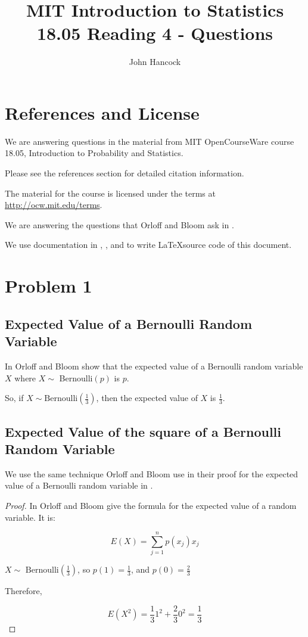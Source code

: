 \documentclass[a4paper,11pt]{article}
\author{John Hancock}
\title{MIT Introduction to Statistics 18.05 Reading 4 - Questions }
\begin{document}
\maketitle
\tableofcontents
\section{References and License}
We are answering questions in the material from MIT OpenCourseWare
course 18.05, Introduction to Probability and Statistics.

Please see the references section for detailed citation information.

The material for the course is licensed under the terms at 
\url{http://ocw.mit.edu/terms}.

We are answering the questions that Orloff and Bloom ask in
\cite{reading4bQ}.

We use documentation in  \cite{latexTilde}, \cite{latexBreakEquation}, 
and \cite{latexProof} to write \LaTeX source code of this document.
 
\label{prob1}
\section{Problem 1}
\subsection{Expected Value of a Bernoulli Random Variable}

In \cite{reading4b} Orloff and Bloom show that the expected value
of a  Bernoulli random variable $X$ where 
$X \sim$  Bernoulli$ \left( p \right)$ is $p$.

So, if $X \sim \text{Bernoulli} \left( \frac{1}{3} \right)$, then
the expected value of $X$ is $\frac{1}{3}$.

\subsection{Expected Value of the square of a Bernoulli Random Variable}

We use the same technique Orloff and Bloom use in their proof for the
expected value of a Bernoulli random variable in \cite{reading4b}.

\begin{proof}
In \cite{reading4b} Orloff and Bloom give the formula for the expected
value of a random variable. It is:

\begin{equation}\label{expectedValFormula}
E \left( X \right) = \sum_{j=1}^{n} p \left( x_{j} \right) x_{j}
\end{equation}

$X \sim \text{ Bernoulli} \left( \frac{1}{3} \right)$, so 
$ p \left( 1 \right) = \frac{1}{3} $, and 
$ p \left( 0 \right) = \frac{2}{3} $

Therefore,

\begin{equation}
  E \left( X^{2} \right) =  \frac{1}{3} 1^{2}
    +  \frac{2}{3} 0^{2} = \frac{1}{3}
\end{equation}
\end{proof}
\end{document}
